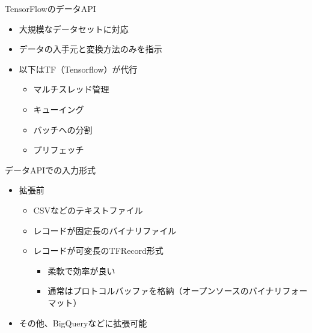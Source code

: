 \documentclass[aspectratio=169, dvipdfmx, 14pt, xcolor={svgnames,dvipsnames}, t]{beamer}
\begin{document}
\begin{frame}{TensorFlowのデータAPI}

  \begin{itemize}
    \tightlist
    \item
          \alert{大規模なデータセット}に対応
    \item
          データの\alert{入手元}と\alert{変換方法}のみを指示
    \item
          以下はTF（Tensorflow）が代行

          \begin{itemize}
            \tightlist
            \item
                  マルチスレッド管理
            \item
                  キューイング
            \item
                  バッチへの分割
            \item
                  プリフェッチ
          \end{itemize}
  \end{itemize}

\end{frame}


\begin{frame}{データAPIでの入力形式}

  \begin{itemize}
    \tightlist
    \item
          拡張前

          \begin{itemize}
            \tightlist
            \item
                  CSVなどの\alert{テキストファイル}
            \item
                  レコードが固定長の\alert{バイナリファイル}
            \item
                  レコードが可変長の\alert{TFRecord形式}

                  \begin{itemize}
                    \tightlist
                    \item
                          柔軟で効率が良い
                    \item
                          通常はプロトコルバッファを格納（オープンソースのバイナリフォーマット）
                  \end{itemize}
          \end{itemize}
    \item
          その他、BigQueryなどに拡張可能
  \end{itemize}

\end{frame}
\end{document}
